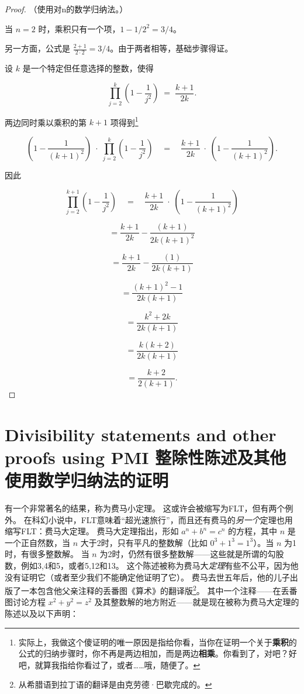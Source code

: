 \begin{proof}
（使用对n的数学归纳法。）

当 $n = 2$ 时，乘积只有一个项，$1-1/2^2 = 3/4$。

另一方面，公式是 $\displaystyle \frac{2+1}{2\cdot2} = 3/4$。由于两者相等，基础步骤得证。


设 $k$ 是一个特定但任意选择的整数，使得

\[ \prod_{j=2}^k \left( 1 - \frac{1}{j^2} \right) \; = \; \frac{k+1}{2k}. \]

两边同时乘以乘积的第 $k+1$ 项得到\footnote{实际上，我做这个傻证明的唯一原因是指给你看，当你在证明一个关于{\bf 乘积}的公式的归纳步骤时，你不再是两边相加，而是两边{\bf 相乘}。你看到了，对吧？好吧，就算我指给你看过了，或者……哦，随便了。}

\[ \left( 1 - \frac{1}{(k+1)^2} \right) \; \cdot \; \prod_{j=2}^k \left( 1 - \frac{1}{j^2} \right) \quad  = \quad \frac{k+1}{2k} \; \cdot \; \left( 1 - \frac{1}{(k+1)^2} \right). \]

因此

\[ \prod_{j=2}^{k+1} \left( 1 - \frac{1}{j^2} \right) \quad  = \quad \frac{k+1}{2k} \; \cdot \; \left( 1 - \frac{1}{(k+1)^2} \right) \]

\[ = \frac{k+1}{2k} - \frac{(k+1)}{2k(k+1)^2} \]

\[ = \frac{k+1}{2k} - \frac{(1)}{2k(k+1)} \]

\[ = \frac{(k+1)^2 - 1}{2k(k+1)} \]

\[ = \frac{k^2+2k}{2k(k+1)} \]

\[ = \frac{k (k+2)}{2k(k+1)} \]

\[ = \frac{k+2}{2(k+1)}.
\]

\end{proof}

\newpage
  


 
\newpage

\section[Other proofs using PMI 其他使用数学归纳法的证明]{Divisibility statements and other proofs using PMI 整除性陈述及其他使用数学归纳法的证明}
\label{sec:other_pmi}

有一个非常著名的结果，称为费马小定理。
这或许会被缩写为FLT，但有两个例外。
在科幻小说中，FLT意味着“超光速旅行”，而且还有费马的\emph{另一个}定理也用缩写FLT：费马大定理。
费马大定理指出，形如 $a^n+b^n=c^n$ 的方程，其中 $n$ 是一个正自然数，当 $n$ 大于2时，只有平凡的整数解（比如 $0^3+1^3=1^3$）。当 $n$ 为1时，有很多整数解。
当 $n$ 为2时，仍然有很多整数解——这些就是所谓的勾股数，例如3,4和5，或者5,12和13。
这个陈述被称为费马大\emph{定理}有些不公平，因为他没有证明它（或者至少我们不能确定他证明了它）。
费马去世五年后，他的儿子出版了一本包含他父亲注释的丢番图《算术》的翻译版\footnote{从希腊语到拉丁语的翻译是由克劳德·巴歇完成的。}。
其中一个注释——在丢番图讨论方程 $x^2+y^2=z^2$ 及其整数解的地方附近——就是现在被称为费马大定理的陈述以及以下声明：


